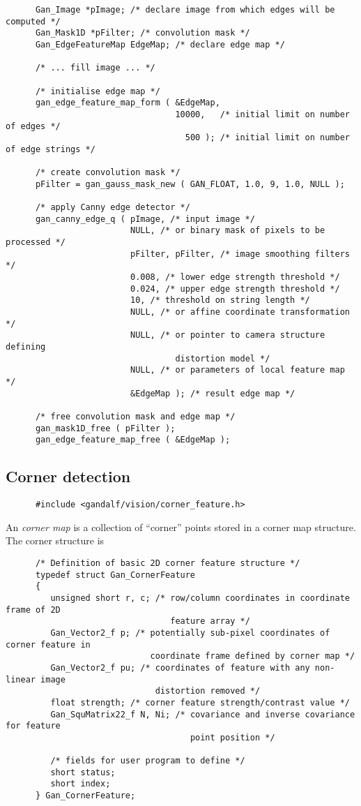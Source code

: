 \begin{verbatim}
      Gan_Image *pImage; /* declare image from which edges will be computed */
      Gan_Mask1D *pFilter; /* convolution mask */
      Gan_EdgeFeatureMap EdgeMap; /* declare edge map */

      /* ... fill image ... */

      /* initialise edge map */
      gan_edge_feature_map_form ( &EdgeMap,
                                  10000,   /* initial limit on number of edges */
                                    500 ); /* initial limit on number of edge strings */

      /* create convolution mask */
      pFilter = gan_gauss_mask_new ( GAN_FLOAT, 1.0, 9, 1.0, NULL );
      
      /* apply Canny edge detector */
      gan_canny_edge_q ( pImage, /* input image */
                         NULL, /* or binary mask of pixels to be processed */
                         pFilter, pFilter, /* image smoothing filters */
                         0.008, /* lower edge strength threshold */
                         0.024, /* upper edge strength threshold */
                         10, /* threshold on string length */
                         NULL, /* or affine coordinate transformation */
                         NULL, /* or pointer to camera structure defining
                                  distortion model */
                         NULL, /* or parameters of local feature map */
                         &EdgeMap ); /* result edge map */

      /* free convolution mask and edge map */
      gan_mask1D_free ( pFilter );
      gan_edge_feature_map_free ( &EdgeMap );
\end{verbatim}

\subsection{Corner detection}
\begin{verbatim}
      #include <gandalf/vision/corner_feature.h>
\end{verbatim}
An {\em corner map} is a collection of ``corner'' points stored in
a corner map structure. The corner structure is
\begin{verbatim}
      /* Definition of basic 2D corner feature structure */
      typedef struct Gan_CornerFeature
      {
         unsigned short r, c; /* row/column coordinates in coordinate frame of 2D
                                 feature array */
         Gan_Vector2_f p; /* potentially sub-pixel coordinates of corner feature in
                             coordinate frame defined by corner map */
         Gan_Vector2_f pu; /* coordinates of feature with any non-linear image
                              distortion removed */
         float strength; /* corner feature strength/contrast value */
         Gan_SquMatrix22_f N, Ni; /* covariance and inverse covariance for feature
                                     point position */

         /* fields for user program to define */
         short status;
         short index;
      } Gan_CornerFeature;
\end{verbatim}

